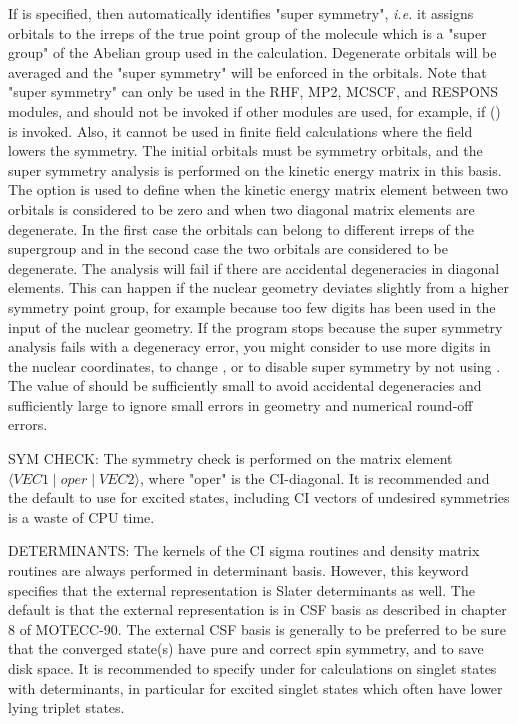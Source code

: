 If  is specified, then
{\sir} automatically identifies "super symmetry",
{\it i.e.\/} it assigns orbitals to the irreps of the true point
group of the molecule which is a
"super group" of the Abelian group used in the calculation.
Degenerate orbitals will be averaged and the "super symmetry"
will be enforced in the orbitals.
Note that "super symmetry" can only be used
in the RHF, MP2, MCSCF, and RESPONS modules, and should
not be invoked if other modules are used,
for example, if  (\aba) is invoked.
Also, it cannot be used
in finite field calculations where the field lowers the symmetry.
The initial orbitals must be symmetry orbitals, and the super symmetry
analysis is performed on the kinetic energy matrix in this basis.
The  option is used to define when the kinetic
energy matrix element between two orbitals is considered to be
zero and when two diagonal matrix elements are degenerate. In the
first case the orbitals can belong to different irreps of the
supergroup and in the second case the two orbitals are considered
to be degenerate. The analysis will fail if there are accidental
degeneracies in diagonal elements.  This can happen if the nuclear
geometry deviates slightly from a higher symmetry point group, for
example because too few digits has been used in the input of the
nuclear geometry. If the program stops because the super symmetry
analysis fails with a degeneracy error, you might consider to use
more digits in the nuclear coordinates, to change , or
to disable super symmetry by not using .  The value of
 should be sufficiently small to avoid accidental
degeneracies and sufficiently large to ignore small errors in
geometry and numerical round-off errors.


SYM CHECK: The symmetry check is performed on the matrix element
$\langle VEC1 \mid oper \mid VEC2\rangle$, where "oper" is
the CI-diagonal.
It is recommended and the default to use 
for excited states, including
CI vectors of undesired symmetries is a waste of CPU time.

DETERMINANTS: The kernels of the CI sigma routines and density matrix
routines are always performed in determinant
basis.  However, this
keyword specifies that the external representation is Slater
determinants as well.  The default is that the external representation
is in CSF basis as
described in chapter 8 of MOTECC-90.  The external
CSF basis is
generally to be preferred to be sure that the converged
state(s) have pure and correct spin symmetry, and
to save disk space.
It is recommended to specify  under
 for
calculations on singlet states with
determinants,
in particular for
excited singlet states which often have lower lying triplet states.


